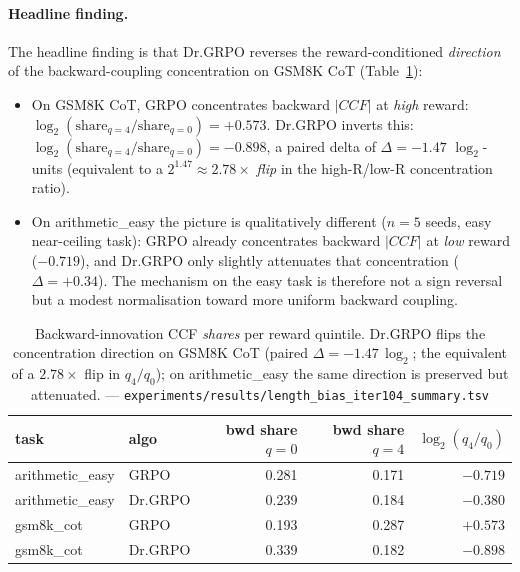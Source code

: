 \paragraph{Headline finding.}
The headline finding is that Dr.GRPO reverses the reward-conditioned
\emph{direction} of the backward-coupling concentration on GSM8K CoT
(Table~\ref{tab:length-bias-iter104-share}):

\begin{itemize}
\item On GSM8K CoT, GRPO concentrates backward $|CCF|$ at \emph{high}
reward: $\log_2(\mathrm{share}_{q=4}/\mathrm{share}_{q=0}) = +0.573$.
Dr.GRPO inverts this: $\log_2(\mathrm{share}_{q=4}/\mathrm{share}_{q=0})
= -0.898$, a paired delta of $\Delta = -1.47$ $\log_2$-units
(equivalent to a $2^{1.47}\approx 2.78\times$ \emph{flip} in the
high-R/low-R concentration ratio).
\item On arithmetic\_easy the picture is qualitatively different
($n=5$ seeds, easy near-ceiling task): GRPO already concentrates
backward $|CCF|$ at \emph{low} reward ($-0.719$), and Dr.GRPO only
slightly attenuates that concentration ($\Delta = +0.34$). The
mechanism on the easy task is therefore not a sign reversal but a
modest normalisation toward more uniform backward coupling.
\end{itemize}

\begin{table}[t]
\centering
\small
\setlength{\tabcolsep}{6pt}
\begin{tabular}{l l r r r}
\hline
task & algo & bwd share $q=0$ & bwd share $q=4$ &
$\log_2(q_4/q_0)$ \\
\hline
arithmetic\_easy & GRPO     & 0.281 & 0.171 & $-0.719$ \\
arithmetic\_easy & Dr.GRPO  & 0.239 & 0.184 & $-0.380$ \\
\hline
gsm8k\_cot       & GRPO     & 0.193 & 0.287 & $+0.573$ \\
gsm8k\_cot       & Dr.GRPO  & 0.339 & 0.182 & $-0.898$ \\
\hline
\end{tabular}
\caption{Backward-innovation CCF \emph{shares} per reward quintile. Dr.GRPO
flips the concentration direction on GSM8K CoT (paired $\Delta =
-1.47\,\log_2$; the equivalent of a $2.78\times$ flip in
$q_{4}/q_{0}$); on arithmetic\_easy the same direction is preserved
but attenuated. --- \texttt{experiments/results/length\_bias\_iter104\_summary.tsv}}
\label{tab:length-bias-iter104-share}
\end{table}

